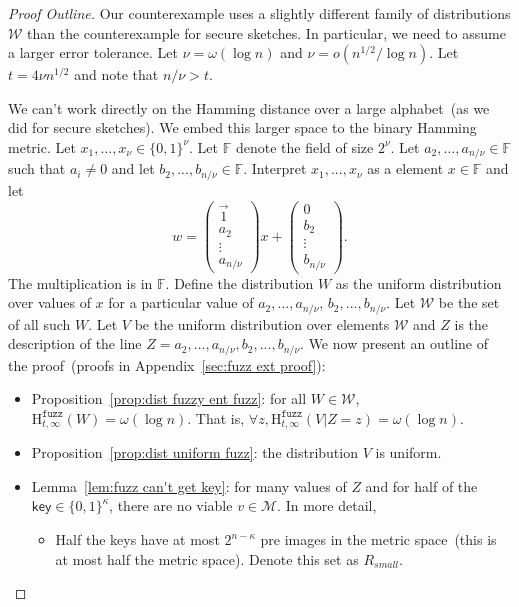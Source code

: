 \documentclass[11pt]{article}
\newcommand{\apref}[1]{\mbox{Appendix~\ref{#1}}}
\newcommand{\lemref}[1]{\mbox{Lemma~\ref{#1}}}
\newcommand{\propref}[1]{\mbox{Proposition~\ref{#1}}}
\newcommand{\class}[1]{{\ensuremath{\mathsf{#1}}}}
\newcommand{\key}{\ensuremath{\class{key}}\xspace}
\newcommand{\zo}{\ensuremath{\{0, 1\}}}
\newcommand{\Hfuzz}{\mathrm{H}^{\mathtt{fuzz}}_{t,\infty}}
\begin{document}
\begin{proof}[Proof Outline]
Our counterexample uses a slightly different family of distributions $\mathcal{W}$ than the counterexample for secure sketches.  In particular, we need to assume a larger error tolerance.  Let $\nu = \omega(\log n)$ and $\nu = o(n^{1/2}/\log n)$.  Let $t=4\nu n^{1/2}$ and note that $n/\nu >t$.  

We can't work directly on the Hamming distance over a large alphabet~(as we did for secure sketches).  We embed this larger space to the binary Hamming metric.
Let $x_1,..., x_\nu \in \zo^\nu$.  Let $\mathbb{F}$ denote the field of size $2^{\nu}$.  Let $a_2,..., a_{n/\nu}\in\mathbb{F}$ such that $a_i\neq 0$ and let $b_2,..., b_{n/\nu}\in\mathbb{F}$.  
Interpret $x_1,..., x_{\nu}$ as a element $x\in \mathbb{F}$ and let 
\[w =  \begin{pmatrix} \vec{1} \\a_2  \\ \vdots \\ a_{n/\nu} \end{pmatrix} x + \begin{pmatrix} 0  \\ 
b_2\\ \vdots \\ b_{n/\nu} \end{pmatrix} .
\]
The multiplication is in $\mathbb{F}$.
Define the distribution $W$ as the uniform distribution over values of $x$ for a particular value of $a_2,..., a_{n/\nu}$, $b_2,..., b_{n/\nu}$.  
Let $\mathcal{W}$ be the set of all such $W$.  Let $V$ be the uniform distribution over elements $\mathcal{W}$ and $Z$ is the description of the line $Z = a_2,..., a_{n/\nu}, b_2, ..., b_{n/\nu}$.
We now present an outline of the proof~(proofs in \apref{sec:fuzz ext proof}):
\begin{itemize}
\item \propref{prop:dist fuzzy ent fuzz}: for all $W\in \mathcal{W}$, $\Hfuzz(W) = \omega (\log n)$. That is, $\forall z, \Hfuzz(V | Z=z) = \omega(\log n)$.
\item \propref{prop:dist uniform fuzz}: the distribution $V$ is uniform.
\item \lemref{lem:fuzz can't get key}: for many values of $Z$ and for half of the $\key \in\zo^\kappa$, there are no viable $v\in\mathcal{M}$.  In more detail,
\begin{itemize}
\item Half the keys have at most $2^{n- \kappa}$ pre images in the metric space~(this is at most half the metric space).  Denote this set as $R_{small}$.  

\end{itemize}
\end{itemize}
\end{proof}
\end{document}
